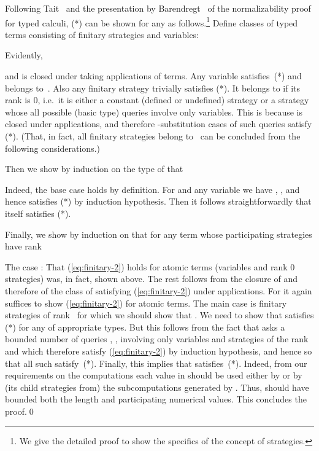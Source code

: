\documentclass[fleqn]{LMCS}
\theoremstyle{plain}\newtheorem{satz}[thm]{Satz}
\theoremstyle{plain}\newtheorem{hyp}[thm]{Hypothesis}
\theoremstyle{plain}\newtheorem{hyps}[thm]{Hypotheses}
\theoremstyle{definition}\newtheorem{note}[thm]{Note}
\newcommand{\?}{\mbox{?}}
\begin{document}
Following Tait~\cite{Tait67} and the presentation by Barendregt~\cite{Barendregt85} of 
the normalizability proof for typed calculi, 
(*) can be shown 
for any  as follows.\footnote{We give the detailed proof to show the specifics of the concept of 
strategies.
}
Define classes of typed terms 
consisting of finitary strategies and variables:

Evidently, 

and  is closed under taking applications of terms. 
Any variable satisfies~(*) and belongs to~. 
Also any finitary strategy trivially satisfies (*).  
It belongs to  if its rank is 0, i.e.\ it is either a constant 
(defined or undefined) strategy or a strategy whose all possible 
(basic type) queries involve only variables. This is because  is closed under 
applications, and therefore -substitution cases of such queries 
satisfy (*). 
(That, in fact, all finitary strategies belong to~ 
can be concluded from the following considerations.) 

Then we show by induction on the type of  that 

Indeed, the base case  holds by definition. 
For  and any variable  
we have , , 
and hence  satisfies (*) by induction hypothesis. 
Then it follows straightforwardly that  itself satisfies (*). 

Finally, we show by induction on  that for any term  whose
participating strategies have rank   

The case : That (\ref{eq:finitary-2}) holds for atomic terms (variables 
and rank 0 strategies) was, in fact, shown above. The rest follows from 
the closure of  and therefore of the class of   satisfying 
(\ref{eq:finitary-2}) under applications. For  it again suffices to show 
(\ref{eq:finitary-2}) for atomic terms. The main case is finitary strategies  
of rank~ for which we should show that . We need to show that 
 satisfies (*) for any  of appropriate types. 
But this follows from the fact that  asks a bounded number of queries , , 
involving only variables  and 
strategies of the rank  and which therefore satisfy 
(\ref{eq:finitary-2}) by induction hypothesis, 
and hence  so that all such 
 satisfy~(*). 
Finally, this implies that  satisfies~(*). 
Indeed, from our requirements on the computations  
each value in  should be used either by  or by (its child strategies from) the  
subcomputations generated by . Thus,  should have bounded both 
the length and participating numerical values. This concludes the proof.\qed
\end{document}
